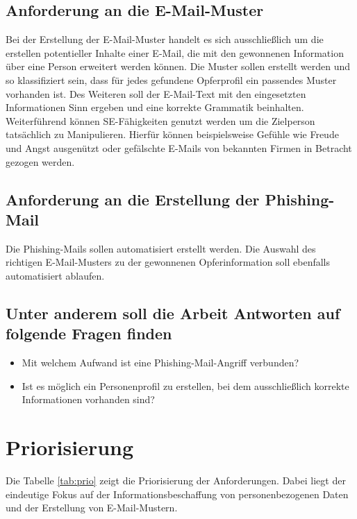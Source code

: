 	\subsection{Anforderung an die E-Mail-Muster}
	Bei der Erstellung der E-Mail-Muster handelt es sich ausschließlich um die erstellen potentieller Inhalte einer E-Mail, die mit den gewonnenen Information über eine Person erweitert werden können. Die Muster sollen erstellt werden und so klassifiziert sein, dass für jedes gefundene Opferprofil ein passendes Muster vorhanden ist. Des Weiteren soll der E-Mail-Text mit den eingesetzten Informationen Sinn ergeben und eine korrekte Grammatik beinhalten. Weiterführend können SE-Fähigkeiten genutzt werden um die Zielperson tatsächlich zu Manipulieren. Hierfür können beispielsweise Gefühle wie Freude und Angst ausgenützt oder gefälschte E-Mails von bekannten Firmen in Betracht gezogen werden.
	
	\subsection{Anforderung an die Erstellung der Phishing-Mail}
	Die Phishing-Mails sollen automatisiert erstellt werden. Die Auswahl des richtigen E-Mail-Musters zu der gewonnenen Opferinformation soll ebenfalls automatisiert ablaufen.
	
	\subsection{Unter anderem soll die Arbeit Antworten auf folgende Fragen finden}
	\begin{itemize}
		\item Mit welchem Aufwand ist eine Phishing-Mail-Angriff verbunden?
		\item Ist es möglich ein Personenprofil zu erstellen, bei dem ausschließlich korrekte Informationen vorhanden sind?
	\end{itemize}
\FloatBarrier

\section{Priorisierung} %
\label{sec:} %
Die Tabelle \ref{tab:prio} zeigt die Priorisierung der Anforderungen. Dabei liegt der eindeutige Fokus auf der Informationsbeschaffung von personenbezogenen Daten und der Erstellung von E-Mail-Mustern.

